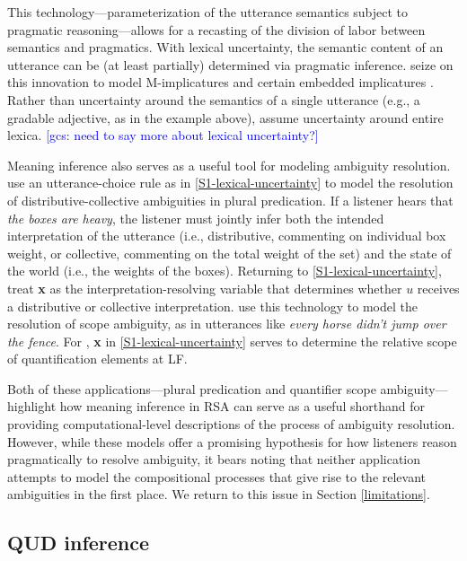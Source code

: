 \documentclass{sp}
\newcommand{\gcs}[1]{\textcolor{blue}{[gcs: #1]}}
\begin{document}
This technology---parameterization of the utterance semantics subject to pragmatic reasoning---allows for a recasting of the division of labor between semantics and pragmatics. With lexical uncertainty, the semantic content of an utterance can be (at least partially) determined via pragmatic inference. \cite{bergenetal2016} seize on this innovation to model M-implicatures \citep{horn1984} and certain embedded implicatures \citep{hurford1974,chierchiaetal2012}. Rather than uncertainty around the semantics of a single utterance (e.g., a gradable adjective, as in the example above), \citeauthor{bergenetal2016} assume uncertainty around entire lexica. \gcs{need to say more about lexical uncertainty?}

Meaning inference also serves as a useful tool for modeling ambiguity resolution. \cite{scontrasgoodman2017} use an utterance-choice rule as in \eqref{S1-lexical-uncertainty} to model the resolution of distributive-collective ambiguities in plural predication. If a listener hears that \emph{the boxes are heavy}, the listener must jointly infer both the intended interpretation of the utterance (i.e., distributive, commenting on individual box weight, or collective, commenting on the total weight of the set) and the state of the world (i.e., the weights of the boxes). Returning to \eqref{S1-lexical-uncertainty}, \citeauthor{scontrasgoodman2017} treat \textbf{x} as the interpretation-resolving variable that determines whether $u$ receives a distributive or collective interpretation. \cite{savinellietal2017,savinellietal2018} use this technology to model the resolution of scope ambiguity, as in utterances like \emph{every horse didn't jump over the fence}. For \citeauthor{savinellietal2017}, \textbf{x} in \eqref{S1-lexical-uncertainty} serves to determine the relative scope of quantification elements at LF. 

Both of these applications---plural predication and quantifier scope ambiguity---highlight how meaning inference in RSA can serve as a useful shorthand for providing computational-level descriptions of the process of ambiguity resolution. However, while these models offer a promising hypothesis for how listeners reason pragmatically to resolve ambiguity, it bears noting that neither application attempts to model the compositional processes that give rise to the relevant ambiguities in the first place. We return to this issue in Section \ref{limitations}.


\subsection{QUD inference}
\end{document}
